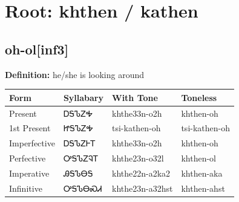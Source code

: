 \documentclass{article}%
\begin{document}
%
\normalsize%
\section*{Root: khthen / kathen}%
\subsection*{oh-ol[inf3]}%
\textbf{Definition: }%
he/she is looking around%
\\[0.5em]%
\begin{tabular}{|l|l|l|l|}%
\hline%
\textbf{Form}&\textbf{Syllabary}&\textbf{With Tone}&\textbf{Toneless}\\%
\hline%
Present&ᎠᎦᏖᏃᎭ&khthe33n{-}o2h&khthen{-}oh\\%
1st Present&ᏥᎦᏖᏃᎭ&tsi{-}kathen{-}oh&tsi{-}kathen{-}oh\\%
Imperfective&ᎠᎦᏖᏃᎰᎢ&khthe33n{-}o2h&khthen{-}oh\\%
Perfective&ᎤᎦᏖᏃᎸᎢ&khthe23n{-}o32l&khthen{-}ol\\%
Imperative&ᎯᎦᏖᎾᎦ&khthe22n{-}a2ka2&khthen{-}aka\\%
Infinitive&ᎤᎦᏖᎾᏍᏗ&khthe23n{-}a32hst&khthen{-}ahst\\%
\hline%
\end{tabular}%
\\[1em]%
\end{document}
